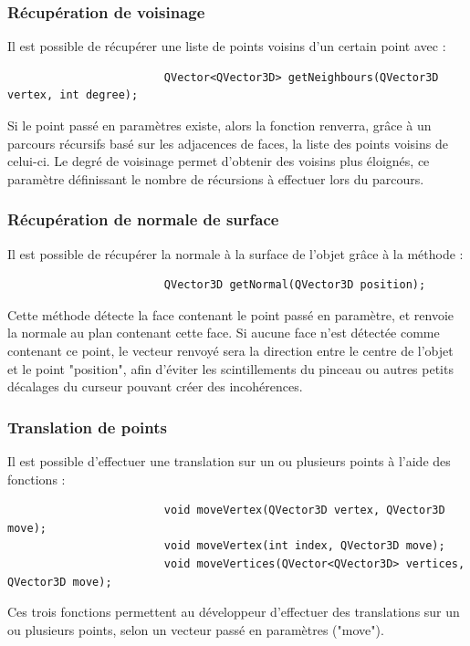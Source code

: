 \documentclass[a4paper]{memoir}
\begin{document}
				\subsubsection{Récupération de voisinage}
					Il est possible de récupérer une liste de points voisins d'un certain point avec :
					\begin{verbatim}
						QVector<QVector3D> getNeighbours(QVector3D vertex, int degree);
					\end{verbatim}
					Si le point passé en paramètres existe, alors la fonction renverra, grâce à un parcours récursifs basé sur les adjacences de faces, la 
					liste des points voisins de celui-ci. Le degré de voisinage permet d'obtenir des voisins plus éloignés, ce paramètre définissant le 
					nombre de récursions à effectuer lors du parcours.
					
				\subsubsection{Récupération de normale de surface}
					Il est possible de récupérer la normale à la surface de l'objet grâce à la méthode :
					\begin{verbatim}
						QVector3D getNormal(QVector3D position);
					\end{verbatim}
					Cette méthode détecte la face contenant le point passé en paramètre, et renvoie la normale au plan contenant cette face. Si aucune face 
					n'est détectée comme contenant ce point, le vecteur renvoyé sera la direction entre le centre de l'objet et le point "position", afin 
					d'éviter les scintillements du pinceau ou autres petits décalages du curseur pouvant créer des incohérences.
					
				\subsubsection{Translation de points}
					Il est possible d'effectuer une translation sur un ou plusieurs points à l'aide des fonctions :
					\begin{verbatim}
						void moveVertex(QVector3D vertex, QVector3D move);
						void moveVertex(int index, QVector3D move);
						void moveVertices(QVector<QVector3D> vertices, QVector3D move);
					\end{verbatim}
					Ces trois fonctions permettent au développeur d'effectuer des translations sur un ou plusieurs points, selon un vecteur passé en 
					paramètres ("move").
					
\end{document}
